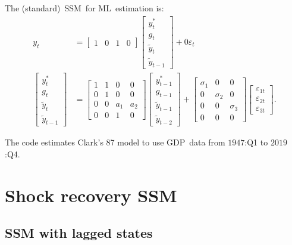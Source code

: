 \documentclass[a4paper,12pt]{article}
\begin{document}
The (standard)\ SSM\ for ML\ estimation is:%
\begin{align*}
y_{t}& =%
\begin{bmatrix}
1 & 0 & 1 & 0%
\end{bmatrix}%
\begin{bmatrix}
y_{t}^{\ast } \\ 
g_{t} \\ 
\tilde{y}_{t} \\ 
\tilde{y}_{t-1}%
\end{bmatrix}%
+0\varepsilon _{t} \\
\begin{bmatrix}
y_{t}^{\ast } \\ 
g_{t} \\ 
\tilde{y}_{t} \\ 
\tilde{y}_{t-1}%
\end{bmatrix}%
& =%
\begin{bmatrix}
1 & 1 & 0 & 0 \\ 
0 & 1 & 0 & 0 \\ 
0 & 0 & a_{1} & a_{2} \\ 
0 & 0 & 1 & 0%
\end{bmatrix}%
\begin{bmatrix}
y_{t-1}^{\ast } \\ 
g_{t-1} \\ 
\tilde{y}_{t-1} \\ 
\tilde{y}_{t-2}%
\end{bmatrix}%
+%
\begin{bmatrix}
\sigma _{1} & 0 & 0 \\ 
0 & \sigma _{2} & 0 \\ 
0 & 0 & \sigma _{3} \\ 
0 & 0 & 0%
\end{bmatrix}%
\begin{bmatrix}
\varepsilon _{1t} \\ 
\varepsilon _{2t} \\ 
\varepsilon _{3t}%
\end{bmatrix}%
.
\end{align*}

The code estimates Clark's 87 model to use GDP\ data from $1947$:Q1 to $2019$%
:Q4.

\pagebreak 

\section{Shock recovery SSM}

\subsection{SSM with lagged states}
\end{document}

